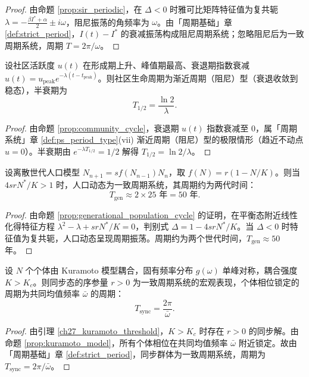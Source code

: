 \begin{proof}
由命题 \ref{prop:sir_periodic}，在 $\Delta<0$ 时雅可比矩阵特征值为复共轭 $\lambda=-\frac{\beta I^*+\alpha}{2}\pm i\omega$，阻尼振荡的角频率为 $\omega$。由「周期基础」章 \cref{def:strict_period}，$I(t)-I^*$ 的衰减振荡构成阻尼周期系统；忽略阻尼后为一致周期系统，周期 $T=2\pi/\omega$。
\end{proof}

\begin{lemma}[社区生命周期的周期判定]\label{lem:community_periodic}
设社区活跃度 $u(t)$ 在形成期上升、峰值期最高、衰退期指数衰减 $u(t)=u_{\text{peak}}e^{-\lambda(t-t_{\text{peak}})}$。则社区生命周期为渐近周期（阻尼）型（衰退收敛到稳态），半衰期为
\[
T_{1/2}=\frac{\ln 2}{\lambda}.
\]
\end{lemma}

\begin{proof}
由命题 \ref{prop:community_cycle}，衰退期 $u(t)$ 指数衰减至 $0$，属「周期系统」章 \cref{def:ps_period_type}(vii) 渐近周期（阻尼）型的极限情形（趋近不动点 $u=0$）。半衰期由 $e^{-\lambda T_{1/2}}=1/2$ 解得 $T_{1/2}=\ln2/\lambda$。
\end{proof}

\begin{lemma}[代际人口周期的周期判定]\label{lem:generational_pop_periodic}
设离散世代人口模型 $N_{n+1}=s f(N_{n-1})N_n$，取 $f(N)=r(1-N/K)$。则当 $4srN^*/K>1$ 时，人口动态为一致周期系统，其周期约为两代时间：
\[
T_{\text{gen}}\approx 2\times 25\text{ 年}=50\text{ 年}.
\]
\end{lemma}

\begin{proof}
由命题 \ref{prop:generational_population_cycle} 的证明，在平衡态附近线性化得特征方程 $\lambda^2-\lambda+srN^*/K=0$，判别式 $\Delta=1-4srN^*/K$。当 $\Delta<0$ 时特征值为复共轭，人口动态呈现周期振荡。周期约为两个世代时间，$T_{\text{gen}}\approx50$ 年。
\end{proof}

\begin{lemma}\label{lem:kuramoto_periodic}
设 $N$ 个个体由 Kuramoto 模型耦合，固有频率分布 $g(\omega)$ 单峰对称，耦合强度 $K>K_c$。则同步态的序参量 $r>0$ 为一致周期系统的宏观表现，个体相位锁定的周期为共同均值频率 $\bar\omega$ 的周期：
\[
T_{\text{sync}}=\frac{2\pi}{\bar\omega}.
\]
\end{lemma}

\begin{proof}
由引理 \ref{ch27_kuramoto_threshold}，$K>K_c$ 时存在 $r>0$ 的同步解。由命题 \ref{prop:kuramoto_model}，所有个体相位在共同均值频率 $\bar\omega$ 附近锁定。故由「周期基础」章 \cref{def:strict_period}，同步群体为一致周期系统，周期为 $T_{\text{sync}}=2\pi/\bar\omega$。
\end{proof}

